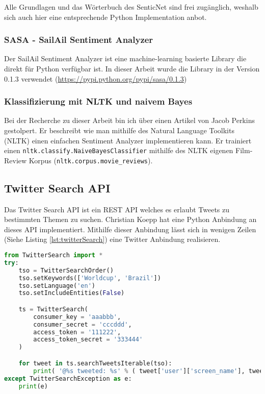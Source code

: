 Alle Grundlagen und das Wörterbuch des SenticNet sind frei zugänglich, weshalb sich auch hier eine entsprechende Python Implementation anbot.

\subsubsection{SASA - SailAil Sentiment Analyzer}
Der SailAil Sentiment Analyzer ist eine machine-learning basierte Library die direkt für Python verfügbar ist. In dieser Arbeit wurde die Library in der Version 0.1.3 verwendet (\url{https://pypi.python.org/pypi/sasa/0.1.3})

\subsubsection{Klassifizierung mit NLTK und naivem Bayes}
Bei der Recherche zu dieser Arbeit bin ich über einen Artikel von Jacob Perkins \cite{nltkbayes} gestolpert. Er beschreibt wie man mithilfe des Natural Language Toolkits (NLTK) \cite{nltk} einen einfachen Sentiment Analyzer implementieren kann. Er trainiert einen \lstinline$nltk.classify.NaiveBayesClassifier$ mithilfe des NLTK eigenen Film-Review Korpus (\lstinline$nltk.corpus.movie_reviews$).

\subsection{Twitter Search API}
\label{subsec:grundlagentwitter}
Das Twitter Search API\cite{twitterapi} ist ein REST API welches es erlaubt Tweets zu bestimmten Themen zu suchen. Christian Koepp hat eine Python Anbindung an dieses API implementiert\cite{twittersearch}. Mithilfe dieser Anbindung lässt sich in wenigen Zeilen (Siehe Listing \ref{lst:twitterSearch}) eine Twitter Anbindung realisieren.

\begin{lstlisting}[language=Python, caption={TwitterSearch Python-Twitter Anbindung}, label={lst:twitterSearch}]
from TwitterSearch import *
try:
    tso = TwitterSearchOrder()
    tso.setKeywords(['Worldcup', 'Brazil'])
    tso.setLanguage('en')
    tso.setIncludeEntities(False)

    ts = TwitterSearch(
    	consumer_key = 'aaabbb', 
    	consumer_secret = 'cccddd', 
    	access_token = '111222', 
    	access_token_secret = '333444'
    )

    for tweet in ts.searchTweetsIterable(tso):
        print( '@%s tweeted: %s' % ( tweet['user']['screen_name'], tweet['text'] ) )
except TwitterSearchException as e:
    print(e)
\end{lstlisting}

